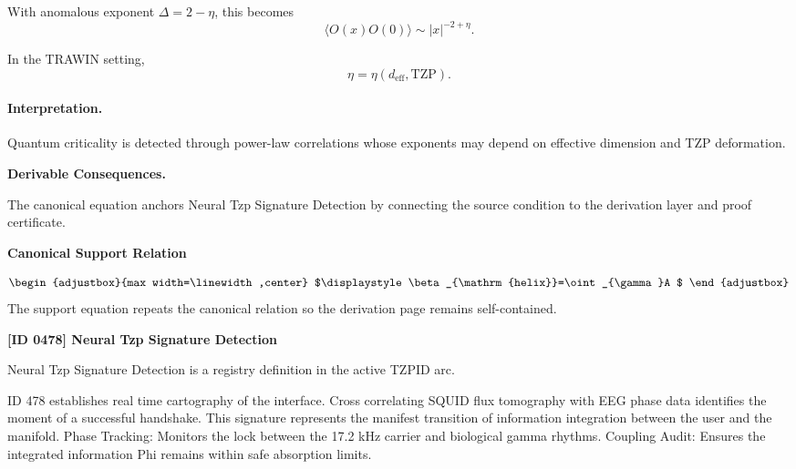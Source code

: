 With anomalous exponent $\Delta=2-\eta$, this becomes
\begin{equation}
\boxed{
\langle O(x)O(0)\rangle
\sim
|x|^{-2+\eta}.
}
\end{equation}

In the TRAWIN setting,
\begin{equation}
\eta=\eta(d_{\mathrm{eff}},\mathrm{TZP}).
\end{equation}

\paragraph{Interpretation.}
Quantum criticality is detected through power-law correlations whose exponents may depend on effective dimension and TZP deformation.

\par\vspace{0.35em}
\noindent\textbf{Derivable Consequences.}\quad
\begingroup
\footnotesize
\raggedright
The canonical equation anchors Neural Tzp Signature Detection by connecting the source condition to the derivation layer and proof certificate.
\par\endgroup

\noindent\textbf{Canonical Support Relation}\par
\[
\begin{adjustbox}{max width=\linewidth,center}
$\displaystyle
\beta_{\mathrm{helix}}=\oint_{\gamma}A
$
\end{adjustbox}
\]
\noindent The support equation repeats the canonical relation so the derivation page remains self-contained.\par

\clearpage
\noindent\textbf{[ID 0478] Neural Tzp Signature Detection}\par
\vspace{0.35em}
\begingroup\small
{}
Neural Tzp Signature Detection is a registry definition in the active TZPID arc.

ID 478 establishes real time cartography of the interface. Cross correlating SQUID flux tomography with EEG phase data identifies the moment of a successful handshake. This signature represents the manifest transition of information integration between the user and the manifold. Phase Tracking: Monitors the lock between the 17.2 kHz carrier and biological gamma rhythms. Coupling Audit: Ensures the integrated information Phi remains within safe absorption limits.

